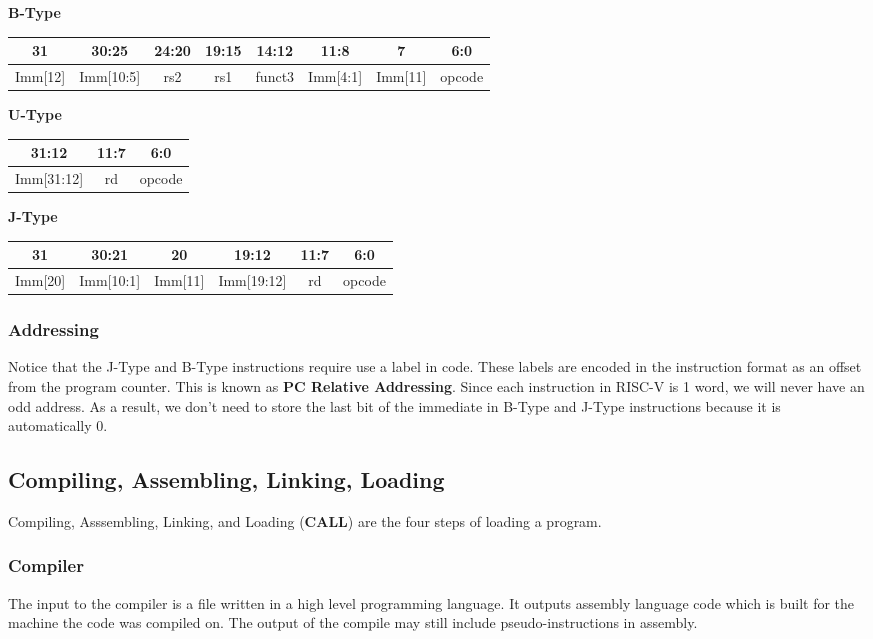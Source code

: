 \documentclass{article}
\begin{document}
\textbf{B-Type}
\begin{center}
    \begin{tabular}{|c|c|c|c|c|c|c|c|}
        31 & 30:25 & 24:20 & 19:15 & 14:12 & 11:8 & 7 & 6:0\\
        \hline
        Imm[12] & Imm[10:5] & rs2 & rs1 & funct3 & Imm[4:1] & Imm[11] & opcode\\
        \hline
    \end{tabular}
\end{center}
\textbf{U-Type}
\begin{center}
    \begin{tabular}{|c|c|c|}
        31:12 & 11:7 & 6:0\\
        \hline
        Imm[31:12] & rd & opcode\\
        \hline
    \end{tabular}
\end{center}
\textbf{J-Type}
\begin{center}
    \begin{tabular}{|c|c|c|c|c|c|}
        31 & 30:21 & 20 & 19:12 & 11:7 & 6:0\\
        \hline
        Imm[20] & Imm[10:1] & Imm[11] & Imm[19:12] & rd & opcode\\
        \hline
    \end{tabular}
\end{center}
\subsubsection{Addressing}
Notice that the J-Type and B-Type instructions require use a label in code.
These labels are encoded in the instruction format as an offset from the program counter.
This is known as \textbf{PC Relative Addressing}. Since each instruction in RISC-V is 1 word,
we will never have an odd address. As a result, we don't need to store the last bit of the immediate
in B-Type and J-Type instructions because it is automatically 0.
\subsection{Compiling, Assembling, Linking, Loading}
Compiling, Asssembling, Linking, and Loading (\textbf{CALL}) are the four steps of loading a program.
\subsubsection{Compiler}
The input to the compiler is a file written in a high level programming language. It outputs assembly language
code which is built for the machine the code was compiled on. The output of the compile may still include 
pseudo-instructions in assembly.
\end{document}
